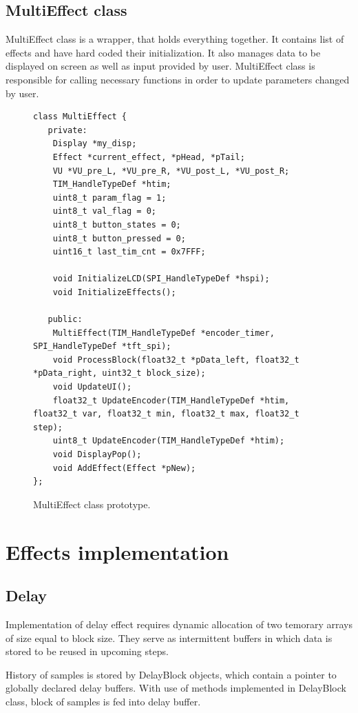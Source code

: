 \documentclass[a4paper,twoside,12pt]{book}
\begin{document}
\newpage

\subsection{MultiEffect class}
MultiEffect class is a wrapper, that holds everything together.
It contains list of effects and have hard coded their initialization.
It also manages data to be displayed on screen
as well as input provided by user.
MultiEffect class is responsible for calling necessary functions
in order to update parameters changed by user.

\begin{figure}[H]
\centering
\begin{lstlisting}
class MultiEffect {
   private:
    Display *my_disp;
    Effect *current_effect, *pHead, *pTail;
    VU *VU_pre_L, *VU_pre_R, *VU_post_L, *VU_post_R;
    TIM_HandleTypeDef *htim;
    uint8_t param_flag = 1;
    uint8_t val_flag = 0;
    uint8_t button_states = 0;
    uint8_t button_pressed = 0;
    uint16_t last_tim_cnt = 0x7FFF;

    void InitializeLCD(SPI_HandleTypeDef *hspi);
    void InitializeEffects();

   public:
    MultiEffect(TIM_HandleTypeDef *encoder_timer, SPI_HandleTypeDef *tft_spi);
    void ProcessBlock(float32_t *pData_left, float32_t *pData_right, uint32_t block_size);
    void UpdateUI();
    float32_t UpdateEncoder(TIM_HandleTypeDef *htim, float32_t var, float32_t min, float32_t max, float32_t step);
    uint8_t UpdateEncoder(TIM_HandleTypeDef *htim);
    void DisplayPop();
    void AddEffect(Effect *pNew);
};
\end{lstlisting}
\caption{MultiEffect class prototype.}
\label{fig:Multi}
\end{figure}

\section{Effects implementation}

\subsection{Delay}
Implementation of delay effect requires dynamic allocation
of two temorary arrays of size equal to block size.
They serve as intermittent buffers in which data is stored
to be reused in upcoming steps.

History of samples is stored by DelayBlock objects,
which contain a pointer to globally declared delay buffers.
With use of methods implemented in DelayBlock class,
block of samples is fed into delay buffer.
\end{document}
